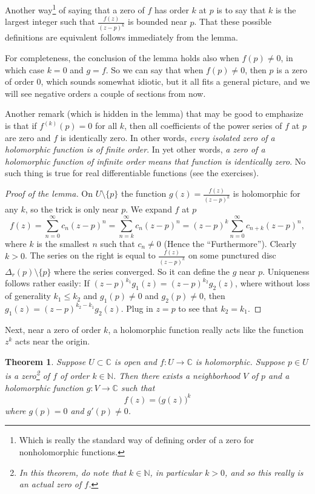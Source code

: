 \documentclass[12pt,openany]{book}
\newcommand{\C}{{\mathbb{C}}}
\newcommand{\N}{{\mathbb{N}}}
\theoremstyle{plain}
\newtheorem{thm}{Theorem}[section]
\theoremstyle{remark}
\theoremstyle{definition}
\theoremstyle{exercise}
\theoremstyle{example}
\begin{document}
Another way\footnote{Which is really the standard way of defining order of a
zero for nonholomorphic functions.}
of saying that a zero of $f$ has order $k$ at $p$ is to say that
$k$ is the largest integer such that $\frac{f(z)}{{(z-p)}^{k}}$ is bounded
near $p$.  That these possible definitions are equivalent
follows immediately from the lemma.

For completeness, the conclusion of the lemma holds also when $f(p) \not= 0$,
in which case
$k=0$ and $g = f$.  So we can say that when $f(p) \not= 0$, then $p$ is
a zero of order $0$, which sounds somewhat idiotic, but it all fits a general
picture, and we will see negative orders a couple of sections from now.

Another remark (which is hidden in the lemma)
that may be good to emphasize is that if $f^{(k)}(p) = 0$
for all $k$, then all coefficients of the power series of $f$ at $p$ are
zero and $f$ is identically zero.  In other words, \emph{every isolated
zero of a holomorphic function is of finite order}.
In yet other words, \emph{a zero of a holomorphic function of
infinite order means that function is identically zero}.
No such
thing is true for real differentiable functions (see the exercises).

\begin{proof}[Proof of the lemma]
On $U \setminus \{ p \}$ the function $g(z) = \frac{f(z)}{{(z-p)}^k}$ is
holomorphic for any $k$, so the trick is only near $p$.  We expand $f$ at $p$
\begin{equation*}
f(z) =
\sum_{n=0}^\infty c_n {(z-p)}^n =
\sum_{n=k}^\infty c_n {(z-p)}^n 
= {(z-p)}^k
\sum_{n=0}^\infty c_{n+k} {(z-p)}^{n} ,
\end{equation*}
where $k$ is the smallest $n$ such that $c_n \not= 0$ (Hence the ``Furthermore'').
Clearly $k > 0$.
The series on the right is equal to $\frac{f(z)}{{(z-p)}^k}$ on
some punctured disc $\Delta_r(p)\setminus \{ p \}$ where the series
converged.
So it can define the $g$ near $p$.  Uniqueness follows rather easily:
If ${(z-p)}^{k_1} g_1(z) = {(z-p)}^{k_2} g_2(z)$, where without loss of generality
$k_1 \leq k_2$ and $g_1(p) \not= 0$ and $g_2(p) \not= 0$, then 
$g_1(z) = {(z-p)}^{k_2-k_1} g_2(z)$.  Plug in $z=p$ to see that $k_2 =
k_1$.
\end{proof}

Next, near a zero of order $k$, a holomorphic function really acts like the
function $z^k$ acts near the origin.

\begin{thm}
Suppose $U \subset \C$ is open and $f \colon U \to \C$ is holomorphic.
Suppose $p \in U$ is a zero\footnote{In this theorem, do note
that $k \in \N$, in particular $k > 0$, and so this really is an actual zero
of $f$.} of $f$ of order $k \in \N$.  Then there exists a neighborhood $V$
of $p$ and a holomorphic function $g \colon V \to \C$ such that
\begin{equation*}
f(z) = {\bigl( g(z) \bigr)}^k
\end{equation*}
where $g(p) = 0$ and $g'(p) \not= 0$.
\end{thm}
\end{document}

